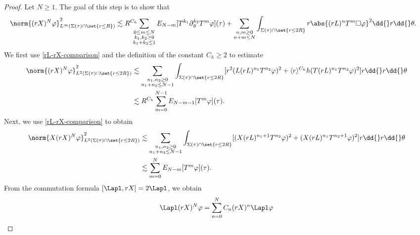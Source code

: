 \documentclass[10pt, reqno]{amsart}
\begin{document}
\begin{proof}
 Let \(N\ge 1\). The goal of this step is to show that
\begin{equation}\label{pointwise-near-step-goal}
\begin{split}
&\norm{(rX)^N\varphi{}}_{L^\infty(\Sigma{}(\tau{})\cap \set{r\le R})}^2 \lesssim R^{C_h}\!\!\!\!\!\sum_{\substack{0\le m\le N \\ k_1,k_2\ge 0\\k_1+k_2\le 1}}E_{N-m}[T^{k_1}\partial{}_\theta^{k_2}T^m\varphi{}](\tau{}) + \sum_{\substack{n,m\ge 0 \\ n + m\le N}} \int _{\Sigma{}(\tau{})\cap \set{r\le 2R}} r\abs{(rL)^{n}T^{m}\Box{}\varphi{}}^2\dd{}r\dd{}\theta{}.
\end{split}
\end{equation}
We first use \cref{rL-rX-comparison} and the definition of the constant \(C_{h}\ge
2\) to estimate
\begin{equation}\label{pointwise-near-prep-1}
\begin{split}
\norm{(rX)^N\varphi{}}_{L^2(\Sigma{}(\tau{})\cap \set{r\le 2R})}^2 &\lesssim  \sum_{\substack{n_1,n_2\ge 0 \\ n_1 + n_2 \le  N-1}}\int_{\Sigma{}(\tau{})\cap \set{r\le 2R}} [r^2(L(rL)^{n_1}T^{n_2}\varphi{})^2 + \langle{}r\rangle^{C_h}h(T(rL)^{n_1}T^{n_2}\varphi{})^2]r\dd{}r\dd{}\theta{} \\
&\lesssim R^{C_h}\sum_{m=0}^{N-1}E_{N-m-1}[T^{m}\varphi{}](\tau{}).
\end{split}
\end{equation}
Next, we use \cref{rL-rX-comparison} to obtain
\begin{equation}\label{pointwise-near-prep-2}
\begin{split}
\norm{X(rX)^N\varphi{}}_{L^2(\Sigma{}(\tau{})\cap \set{r\le 2R})}^2 &\lesssim \sum_{\substack{n_1,n_2\ge 0 \\ n_1 + n_2 \le  N-1}}\int_{\Sigma{}(\tau{})\cap \set{r\le 2R}} [(X(rL)^{n_1+1}T^{n_2}\varphi{})^2 + (X(rL)^{n_1}T^{n_2+1}\varphi{})^2]r\dd{}r\dd{}\theta{} \\
&\lesssim \sum_{m=0}^NE_{N-m}[T^m\varphi{}](\tau{}).
\end{split}
\end{equation}
From the commutation formula \([\Lapl ,rX] = 2\Lapl\), we obtain
\begin{equation}\label{laplacian-rX-commuted}
\Lapl (rX)^N\varphi{} = \sum_{n=0}^NC_n(rX)^n\Lapl \varphi{}
\end{equation}

\end{proof}
\end{document}
